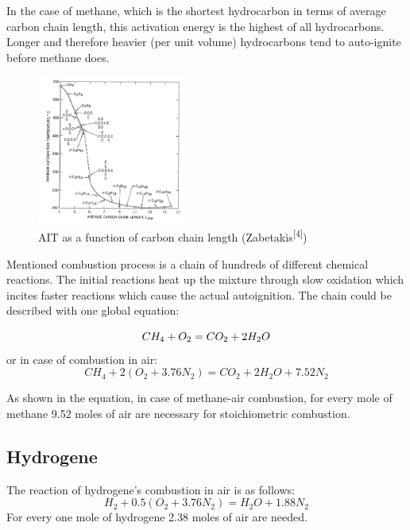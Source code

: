 \documentclass[a4paper,11pt]{article}
\begin{document}
        In the case of methane, which is the shortest hydrocarbon in terms of average carbon chain length, this activation energy is the highest of all hydrocarbons. Longer and therefore heavier (per unit volume) hydrocarbons tend to auto-ignite before methane does.  \par
\begin{figure}[h]
\centering
\includegraphics[width=5cm]{zabetakis.PNG}
\caption{AIT as a function of carbon chain length (Zabetakis\textsuperscript{[4]})}
\end{figure}
    Mentioned combustion process is a chain of hundreds of different chemical reactions. The initial reactions heat up the mixture through slow oxidation which incites faster reactions which cause the actual autoignition. The chain could be described with one global equation: \par
              
    \begin{equation*}
    	CH_4 + O_2 = CO_2 + 2 H_2O\\        
    \end{equation*}
    or in case of combustion in air:
    \begin{equation*}
    	CH_4 + 2(O_2+3.76N_2) = CO_2 + 2H_2O + 7.52 N_2 
     \end{equation*}
     
     As shown in the equation, in case of methane-air combustion, for every mole of methane 9.52 moles of air are necessary for stoichiometric combustion.
     
     \subsection{Hydrogene}
     
	The reaction of hydrogene's combustion  in air is as follows:
	 \begin{equation*}
    	H_2 + 0.5(O_2+3.76N_2) = H_2O + 1.88N_2 
     \end{equation*}
     For every one mole of hydrogene 2.38 moles of air are needed.
     
\end{document}
